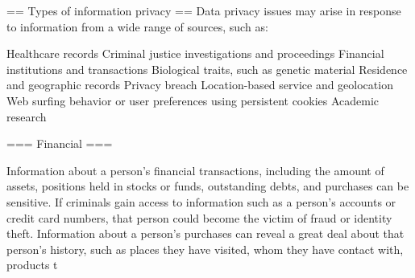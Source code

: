 \documentclass[12pt,a4paper]{report}
\begin{document}
== Types of information privacy ==
Data privacy issues may arise in response to information from a wide range of sources, such as:

Healthcare records
Criminal justice investigations and proceedings
Financial institutions and transactions
Biological traits, such as genetic material
Residence and geographic records
Privacy breach
Location-based service and geolocation
Web surfing behavior or user preferences using persistent cookies
Academic research


=== Financial ===

Information about a person's financial transactions, including the amount of assets, positions held in stocks or funds, outstanding debts, and purchases can be sensitive. If criminals gain access to information such as a person's accounts or credit card numbers, that person could become the victim of fraud or identity theft. Information about a person's purchases can reveal a great deal about that person's history, such as places they have visited, whom they have contact with, products t
\end{document}
